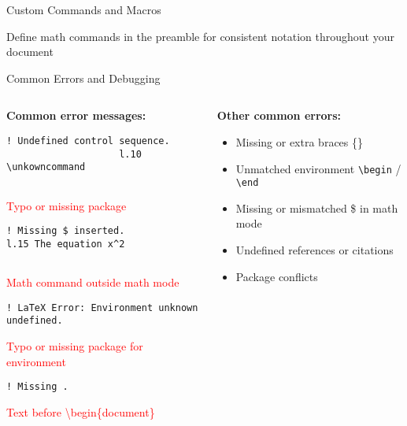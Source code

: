 \begin{frame}[fragile]{Custom Commands and Macros}
     \begin{tip}
          Define math commands in the preamble for consistent notation throughout your document
     \end{tip}
\end{frame}

\begin{frame}[fragile]{Common Errors and Debugging}
     \begin{columns}
          \begin{column}{0.5\textwidth}
               \textbf{Common error messages:}
               
               \begin{lstlisting}[language={}]
                    ! Undefined control sequence.
                    l.10 \unkowncommand
                    
               \end{lstlisting}
               \textcolor{red}{Typo or missing package}
               
\begin{lstlisting}[language={}]
! Missing $ inserted.
l.15 The equation x^2
                    
\end{lstlisting}
               \textcolor{red}{Math command outside math mode}
               
               \begin{lstlisting}[language={}]
! LaTeX Error: Environment unknown 
undefined.
               \end{lstlisting}
               \textcolor{red}{Typo or missing package for environment}
               
               \begin{lstlisting}[language={}]
                    ! Missing .
                    \end{lstlisting}
                    \textcolor{red}{Text before \textbackslash begin\{document\}}
               \end{column}
               
               \begin{column}{0.5\textwidth}
                    \textbf{Other common errors:}
                    \begin{itemize}
                         \item Missing or extra braces \{\}
                         \item Unmatched environment \texttt{\textbackslash begin} / \texttt{\textbackslash end}
                         \item Missing or mismatched \$ in math mode
                         \item Undefined references or citations
                         \item Package conflicts
                    \end{itemize}
                    

\end{column}
\end{columns}
\end{frame}
